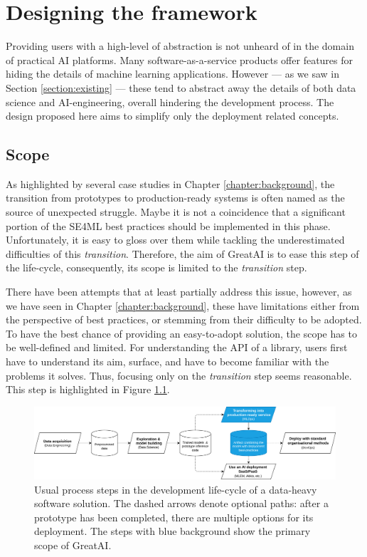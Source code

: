 \chapter{Designing the framework} \label{chapter:design}

Providing users with a high-level of abstraction is not unheard of in the domain of practical AI platforms. Many software-as-a-service products offer features for hiding the details of machine learning applications. However --- as we saw in Section \ref{section:existing} --- these tend to abstract away the details of both data science and AI-engineering, overall hindering the development process. The design proposed here aims to simplify only the deployment related concepts.

\section{Scope} \label{section:scope}

As highlighted by several case studies in Chapter \ref{chapter:background}, the transition from prototypes to production-ready systems is often named as the source of unexpected struggle. Maybe it is not a coincidence that a significant portion of the SE4ML best practices should be implemented in this phase. Unfortunately, it is easy to gloss over them while tackling the underestimated difficulties of this \textit{transition}. Therefore, the aim of GreatAI is to ease this step of the life-cycle, consequently, its scope is limited to the \textit{transition} step.

There have been attempts that at least partially address this issue, however, as we have seen in Chapter \ref{chapter:background}, these have limitations either from the perspective of best practices, or stemming from their difficulty to be adopted. To have the best chance of providing an easy-to-adopt solution, the scope has to be well-defined and limited. For understanding the API of a library, users first have to understand its aim, surface, and have to become familiar with the problems it solves. Thus, focusing only on the \textit{transition} step seems reasonable. This step is highlighted in Figure \ref{fig:scope}.

\begin{figure}
    \centering
    \includegraphics[width=\linewidth]{figures/scope.drawio.png}
    \caption{Usual process steps in the development life-cycle of a data-heavy software solution. The dashed arrows denote optional paths: after a prototype has been completed, there are multiple options for its deployment. The steps with blue background show the primary scope of GreatAI.}
    \label{fig:scope}
\end{figure}

